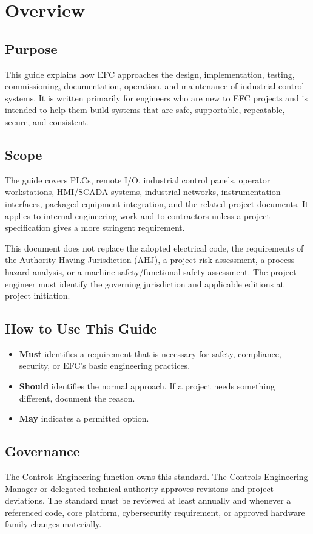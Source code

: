 \chapter{Overview}
\section{Purpose}
This guide explains how EFC approaches the design, implementation, testing, commissioning, documentation, operation, and maintenance of industrial control systems. It is written primarily for engineers who are new to EFC projects and is intended to help them build systems that are safe, supportable, repeatable, secure, and consistent.

\section{Scope}
The guide covers PLCs, remote I/O, industrial control panels, operator workstations, HMI/SCADA systems, industrial networks, instrumentation interfaces, packaged-equipment integration, and the related project documents. It applies to internal engineering work and to contractors unless a project specification gives a more stringent requirement.

This document does not replace the adopted electrical code, the requirements of the Authority Having Jurisdiction (AHJ), a project risk assessment, a process hazard analysis, or a machine-safety/functional-safety assessment. The project engineer must identify the governing jurisdiction and applicable editions at project initiation.

\section{How to Use This Guide}
\begin{itemize}[itemsep=2pt]
  \item \textbf{Must} identifies a requirement that is necessary for safety, compliance, security, or EFC's basic engineering practices.
  \item \textbf{Should} identifies the normal approach. If a project needs something different, document the reason.
  \item \textbf{May} indicates a permitted option.
\end{itemize}

\section{Governance}
The Controls Engineering function owns this standard. The Controls Engineering Manager or delegated technical authority approves revisions and project deviations. The standard must be reviewed at least annually and whenever a referenced code, core platform, cybersecurity requirement, or approved hardware family changes materially.

